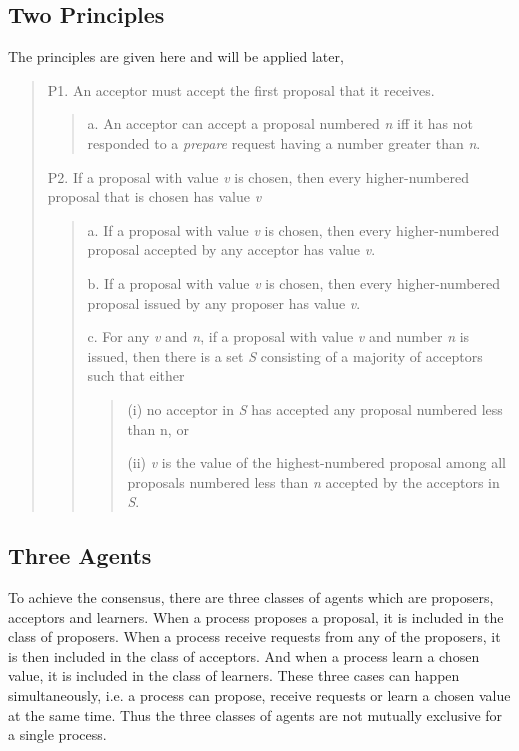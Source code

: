 \documentclass[12pt, a4paper]{article}
\begin{document}
\subsection{Two Principles}
The principles are given here and will be applied later,
\begin{quote}
  P1. An acceptor must accept the first proposal that it receives.
  \begin{quote}
    a. An acceptor can accept a proposal numbered \textit{n}
      iff it has not responded to a \textit{prepare} request
      having a number greater than \textit{n}.
  \end{quote}
  P2. If a proposal with value \textit{v} is chosen,
    then every higher-numbered proposal that is chosen has value \textit{v}
    \begin{quote}
      a. If a proposal with value \textit{v} is chosen,
        then every higher-numbered proposal accepted
        by any acceptor has value \textit{v}.

      b. If a proposal with value \textit{v} is chosen,
        then every higher-numbered proposal issued
        by any proposer has value \textit{v}.

      c. For any \textit{v} and \textit{n},
        if a proposal with value \textit{v}
        and number \textit{n} is issued,
        then there is a set \textit{S} consisting of
        a majority of acceptors such that either
          \begin{quote}
            (i) no acceptor in \textit{S} has accepted
              any proposal numbered less than n, or

            (ii) \textit{v} is the value of
              the highest-numbered proposal among
              all proposals numbered less than
              \textit{n} accepted by the acceptors in \textit{S}.
          \end{quote}
  \end{quote}
\end{quote}

\subsection{Three Agents}
To achieve the consensus, there are three classes of agents which are proposers, acceptors and learners. When a process proposes a proposal, it is included in the class of proposers. When a process receive requests from any of the proposers, it is then included in the class of acceptors. And when a process learn a chosen value, it is included in the class of learners. These three cases can happen simultaneously, i.e. a process can propose, receive requests or learn a chosen value at the same time. Thus the three classes of agents are not mutually exclusive for a single process.
\end{document}
